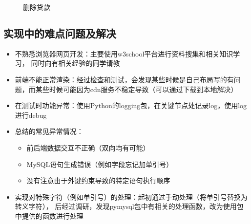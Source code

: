 \documentclass{article}
\begin{document}
    \begin{figure}[H]
        \centering
        \caption{删除贷款}
    \end{figure}
    \subsection{实现中的难点问题及解决}
    \begin{itemize}
        \item 不熟悉浏览器网页开发：主要使用w3school平台进行资料搜集和相关知识学习，
        同时向有相关经验的同学请教
        \item 前端不能正常渲染：经过检查和测试，会发现某些时候是自己布局写的有问题，而某些时候可能因为cdn服务不稳定导致（可以通过下载到本地解决）
        \item 在测试时功能异常：使用Python的logging包，在关键节点处记录log，使用log进行debug
        \item 总结的常见异常情况：
        \begin{itemize}
            \item 前后端数据交互不正确（双向均有可能）
            \item MySQL语句生成错误（例如字段忘记加单引号）
            \item 没有注意由于外键约束导致的特定语句执行顺序
        \end{itemize}
        \item 实现对特殊字符（例如单引号）的处理：起初通过手动处理（将单引号替换为转义字符），
        后经过调研，发现{\jetbrains pymysql}包中有相关的处理函数，改为使用包中提供的函数进行处理
    \end{itemize}
\end{document}
